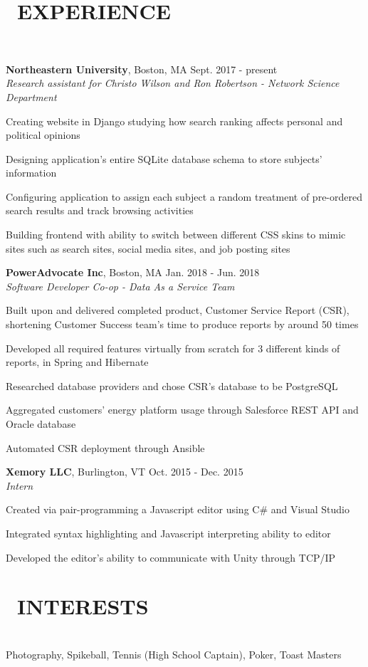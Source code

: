 \documentclass[11pt]{res}
\newcommand{\sectionunderline}{\vspace{-3mm}\hrulefill\\}
\newcommand{\newsect}[1]{\section{\Large \bf #1}}
\begin{document}
\begin{resume}
  \newsect{\faUsers\ EXPERIENCE}{
    \sectionunderline{
      {\bf Northeastern University}, Boston, MA \hfill Sept. 2017 - present\\
      {\it Research assistant for Christo Wilson and Ron Robertson - Network Science Department}
      \begin{itemize}
        {\item Creating website in Django studying how search ranking affects personal and political opinions}
        {\item Designing application's entire SQLite database schema to store subjects' information}
        {\item Configuring application to assign each subject a random treatment of pre-ordered search results and track browsing activities}
        {\item Building frontend with ability to switch between different CSS skins to mimic sites such as search sites, social media sites, and job posting sites}
      \end{itemize}

      {\bf PowerAdvocate Inc}, Boston, MA \hfill Jan. 2018 - Jun. 2018\\
      {\it Software Developer Co-op - Data As a Service Team}
      \begin{itemize}
        {\item Built upon and delivered completed product, Customer Service Report (CSR), shortening Customer Success team's time to produce reports by around 50 times}
        {\item Developed all required features virtually from scratch for 3 different kinds of reports, in Spring and Hibernate}
        {\item Researched database providers and chose CSR's database to be PostgreSQL}
        {\item Aggregated customers' energy platform usage through Salesforce REST API and Oracle database}
        {\item Automated CSR deployment through Ansible}
      \end{itemize}

      {\bf Xemory LLC}, Burlington, VT \hfill Oct. 2015 - Dec. 2015\\
      {\it Intern}
      \begin{itemize}
        {\item Created via pair-programming a Javascript editor using C\# and Visual Studio}
        {\item Integrated syntax highlighting and Javascript interpreting ability to editor}
        {\item Developed the editor's ability to communicate with Unity through TCP/IP}
      \end{itemize}
    }
  }

  \newsect{\faCamera\ INTERESTS}{
    \sectionunderline{
      Photography, Spikeball, Tennis (High School Captain), Poker, Toast Masters
    }
  }
\end{resume}
\end{document}
